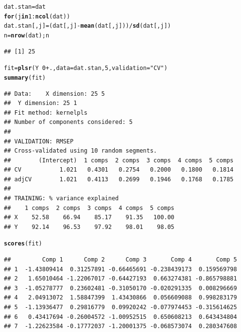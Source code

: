 \documentclass{article}\usepackage[]{graphicx}\usepackage[]{color}
\makeatletter
\newcommand{\hlnum}[1]{\textcolor[rgb]{0.686,0.059,0.569}{#1}}%
\newcommand{\hlstr}[1]{\textcolor[rgb]{0.192,0.494,0.8}{#1}}%
\newcommand{\hlopt}[1]{\textcolor[rgb]{0,0,0}{#1}}%
\newcommand{\hlstd}[1]{\textcolor[rgb]{0.345,0.345,0.345}{#1}}%
\newcommand{\hlkwa}[1]{\textcolor[rgb]{0.161,0.373,0.58}{\textbf{#1}}}%
\newcommand{\hlkwb}[1]{\textcolor[rgb]{0.69,0.353,0.396}{#1}}%
\newcommand{\hlkwc}[1]{\textcolor[rgb]{0.333,0.667,0.333}{#1}}%
\newcommand{\hlkwd}[1]{\textcolor[rgb]{0.737,0.353,0.396}{\textbf{#1}}}%
\newenvironment{kframe}{%
 \def\at@end@of@kframe{}%
 \ifinner\ifhmode%
  \def\at@end@of@kframe{\end{minipage}}%
  \begin{minipage}{\columnwidth}%
 \fi\fi%
 \def\FrameCommand##1{\hskip\@totalleftmargin \hskip-\fboxsep
 \colorbox{shadecolor}{##1}\hskip-\fboxsep
     \hskip-\linewidth \hskip-\@totalleftmargin \hskip\columnwidth}%
 \MakeFramed {\advance\hsize-\width
   \@totalleftmargin\z@ \linewidth\hsize
   \@setminipage}}%
 {\par\unskip\endMakeFramed%
 \at@end@of@kframe}
\newenvironment{knitrout}{}{} %
\makeatother
\begin{document}
\begin{enumerate}[(a)]
\begin{knitrout}
\begin{kframe}
{\ttfamily\noindent\itshape\color{messagecolor}{\#\# \\\#\# Attaching package: 'pls'\\\#\# \\\#\# The following object is masked from 'package:stats':\\\#\# \\\#\#\ \ \ \  loadings}}\begin{alltt}
  \hlstd{dat.stan} \hlkwb{=} \hlstd{dat}
  \hlkwa{for}\hlstd{(j} \hlkwa{in} \hlnum{1}\hlopt{:}\hlkwd{ncol}\hlstd{(dat))}
    \hlstd{dat.stan[,j]} \hlkwb{=} \hlstd{(dat[,j]} \hlopt{-} \hlkwd{mean}\hlstd{(dat[,j]))}\hlopt{/}\hlkwd{sd}\hlstd{(dat[,j])}
  \hlstd{n} \hlkwb{=} \hlkwd{nrow}\hlstd{(dat); n}
\end{alltt}
\begin{verbatim}
## [1] 25
\end{verbatim}
\begin{alltt}
  \hlstd{fit} \hlkwb{=} \hlkwd{plsr}\hlstd{(Y} \hlopt{~}\hlnum{0} \hlopt{+} \hlstd{.,} \hlkwc{data} \hlstd{= dat.stan,} \hlnum{5}\hlstd{,} \hlkwc{validation} \hlstd{=} \hlstr{"CV"}\hlstd{)}
  \hlkwd{summary}\hlstd{(fit)}
\end{alltt}
\begin{verbatim}
## Data: 	X dimension: 25 5 
## 	Y dimension: 25 1
## Fit method: kernelpls
## Number of components considered: 5
## 
## VALIDATION: RMSEP
## Cross-validated using 10 random segments.
##        (Intercept)  1 comps  2 comps  3 comps  4 comps  5 comps
## CV           1.021   0.4301   0.2754   0.2000   0.1800   0.1814
## adjCV        1.021   0.4113   0.2699   0.1946   0.1768   0.1785
## 
## TRAINING: % variance explained
##    1 comps  2 comps  3 comps  4 comps  5 comps
## X    52.58    66.94    85.17    91.35   100.00
## Y    92.14    96.53    97.92    98.01    98.05
\end{verbatim}
\begin{alltt}
  \hlkwd{scores}\hlstd{(fit)}
\end{alltt}
\begin{verbatim}
##         Comp 1      Comp 2      Comp 3       Comp 4       Comp 5
## 1  -1.43809414  0.31257891 -0.66465691 -0.238439173  0.159569798
## 2   1.65010464 -1.22067017 -0.64427193  0.663274381 -0.865798881
## 3  -1.05278777  0.23602481 -0.31050170 -0.020291335  0.008296669
## 4   2.04913072  1.58847399  1.43430866  0.056609088  0.998283179
## 5  -1.13936477  0.29816779  0.09920242 -0.077974453 -0.315614625
## 6   0.43417694 -0.26004572 -1.00952515  0.650608213  0.643434804
## 7  -1.22623584 -0.17772037 -1.20001375 -0.068573074  0.280347608

\end{verbatim}
\end{kframe}
\end{knitrout}
\end{enumerate}
\end{document}
